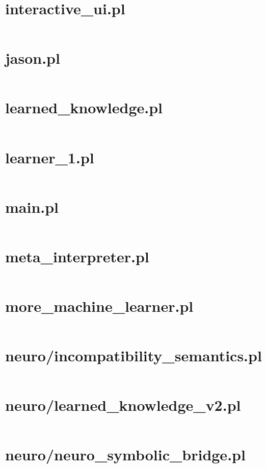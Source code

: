 \documentclass{article}
\begin{document}
\section{interactive\_ui.pl}
\inputminted{prolog}{interactive_ui.pl}

\section{jason.pl}
\inputminted{prolog}{jason.pl}

\section{learned\_knowledge.pl}
\inputminted{prolog}{learned_knowledge.pl}

\section{learner\_1.pl}
\inputminted{prolog}{learner_1.pl}

\section{main.pl}
\inputminted{prolog}{main.pl}

\section{meta\_interpreter.pl}
\inputminted{prolog}{meta_interpreter.pl}

\section{more\_machine\_learner.pl}
\inputminted{prolog}{more_machine_learner.pl}

\section{neuro/incompatibility\_semantics.pl}
\inputminted{prolog}{neuro/incompatibility_semantics.pl}

\section{neuro/learned\_knowledge\_v2.pl}
\inputminted{prolog}{neuro/learned_knowledge_v2.pl}

\section{neuro/neuro\_symbolic\_bridge.pl}
\inputminted{prolog}{neuro/neuro_symbolic_bridge.pl}
\end{document}

